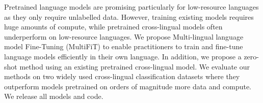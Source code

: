 Pretrained language models are promising particularly for low-resource languages as they only require unlabelled data. However, training existing models requires huge amounts of compute,
while pretrained cross-lingual models often underperform on low-resource languages.
We propose Multi-lingual language model Fine-Tuning (MultiFiT) to enable practitioners to train and fine-tune language models efficiently in their own language. In addition, we propose a zero-shot method using an existing pretrained cross-lingual model. We evaluate our methods on two widely used cross-lingual classification datasets where they outperform models pretrained on orders of magnitude more data and compute. We release all models and code.